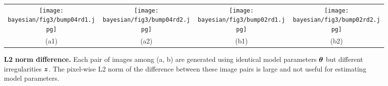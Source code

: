 \begin{figure}[h]
	\centering
	\setlength{\resLen}{0.24\columnwidth}
	\addtolength{\tabcolsep}{-5pt}
	\begin{tabular}{cccc}
		\texttt{[image: bayesian/fig3/bump04rd1.jpg]} &
		\texttt{[image: bayesian/fig3/bump04rd2.jpg]} &
		\texttt{[image: bayesian/fig3/bump02rd1.jpg]} &
		\texttt{[image: bayesian/fig3/bump02rd2.jpg]} \\
		(a1) & (a2) & (b1) & (b2)
	\end{tabular}
	\caption[L2 norm difference]{\label{fig:bayesian:sum_func}
		\textbf{L2 norm difference.} Each pair of images among (a, b) are generated using identical model parameters $\bm{\theta}$ but different irregularities $\bm{z}$. The pixel-wise L2 norm of the difference between these image pairs is large and not useful for estimating model parameters.
	}
\end{figure}